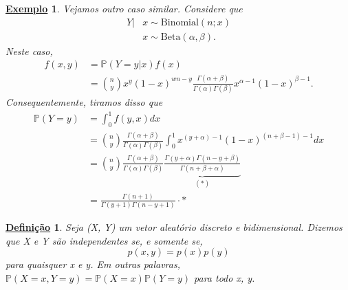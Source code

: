 \documentclass{article}
\newtheorem*{def*}{\underline{Defini\c c\~ao}}
\newtheorem{example}{\underline{Exemplo}}
\begin{document}
\begin{example}
  Vejamos outro caso similar. Considere que 
  \begin{align*}
    Y|&x\sim \mathrm{Binomial}(n;x)\\
      &x\sim \mathrm{Beta}(\alpha , \beta ).
  \end{align*}
  Neste caso, 
  \begin{align*}
    f(x, y) &= \mathbb{P}(Y=y|x)f(x)\\
            &= \binom{n}{y}x^{y}(1-x)^{wn-y}\frac{\Gamma (\alpha +\beta) }{\Gamma (\alpha )\Gamma (\beta )}x^{\alpha -1}(1-x)^{\beta -1}.
  \end{align*}
  Consequentemente, tiramos disso que 
  \begin{align*}
    \mathbb{P}(Y=y) &= \int_{0}^{1}f(y, x)dx\\
                    &= \binom{n}{y}\frac{\Gamma (\alpha +\beta )}{\Gamma (\alpha )\Gamma (\beta )}\int_{0}^{1}x^{(y+\alpha )-1}(1-x)^{(n+\beta -1)-1}dx\\
                    &= \binom{n}{y}\frac{\Gamma (\alpha +\beta )}{\Gamma (\alpha )\Gamma (\beta )}\underbrace{\frac{\Gamma (y+\alpha )\Gamma (n-y+\beta )}{\Gamma (n+\beta +\alpha )}}_{(*)}\\
                    &= \frac{\Gamma (n+1)}{\Gamma (y+1)\Gamma (n-y+1)}\cdot *
  \end{align*}
\end{example}
\begin{def*}
  Seja (X, Y) um vetor aleatório discreto e bidimensional. Dizemos que X e Y são independentes se, e somente se, 
  \[
    p(x, y) = p(x)p(y)
  \]
  para quaisquer x e y. Em outras palavras, \(\mathbb{P}(X=x, Y=y) = \mathbb{P}(X=x)\mathbb{P}(Y=y)\) para todo x, y.
\end{def*}
\end{document}
